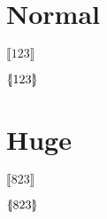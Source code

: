 \documentclass[a4paper,10pt]{article}
\newcommand{\llbrace}{
		\{ \kern -0.27em \vert
	}
\newcommand{\rrbrace}{
		\vert \kern -0.27em \}
	}
\begin{document}
	\section{Normal}

$\llbracket 123 \rrbracket $


\noindent $\llbrace 123 \rrbrace $


	\section{Huge}

\Huge

$\llbracket 823 \rrbracket $


\noindent $\llbrace 823 \rrbrace $
\end{document}
